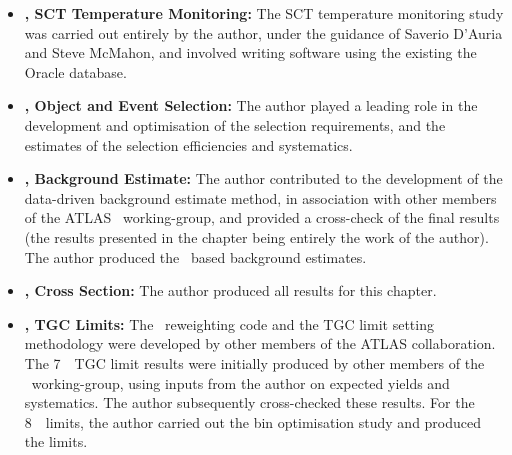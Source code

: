 \begin{itemize}

\item {\bf {}, SCT Temperature Monitoring:} The SCT temperature
monitoring study was carried out entirely by the author, under the guidance of
Saverio D'Auria and Steve McMahon, and involved writing software using
the existing the Oracle database. 

\item {\bf {}, Object and Event Selection:} The author played a
leading role in the development and optimisation of the selection requirements,
and the estimates of the selection efficiencies and systematics.

\item {\bf {}, Background Estimate:} The author contributed to the 
development of the data-driven background estimate method, in association with other members
of the ATLAS \ZZ\ working-group, and provided a cross-check of the final
results (the results presented in the chapter being entirely the work of the
author). The author produced the \mc\ based background estimates.

\item {\bf {}, Cross Section:} The author produced all results for
this chapter.

\item {\bf {}, TGC Limits:} The \AfterBurner\ reweighting code and the TGC
limit setting methodology were developed by other members of the ATLAS
collaboration.
The 7~\tev\ TGC limit results were initially produced by
other members of the \ZZ\ working-group, using inputs from the author on expected
yields and systematics. The author subsequently cross-checked these results. For
the 8~\tev\ limits, the author carried out the bin optimisation study and
produced the limits.

\end{itemize}
